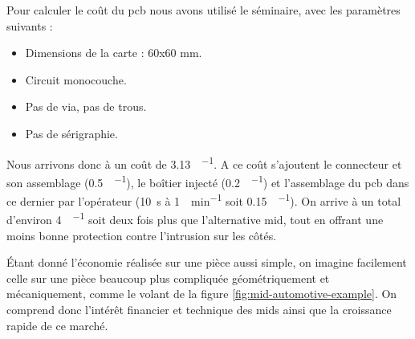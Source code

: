 Pour calculer le coût du \gls{pcb} nous avons utilisé le séminaire\cite{pcb-2013}, avec les paramètres suivants :
\begin{itemize}
    \item Dimensions de la carte : 60x60 \si{\milli\meter}.
    \item Circuit monocouche.
    \item Pas de via, pas de trous.
    \item Pas de sérigraphie.
\end{itemize}

Nous arrivons donc à un coût de \SI{3.13}{\chf\per\piece}.
A ce coût s'ajoutent le connecteur et son assemblage (\SI{0.5}{\chf\per\piece}), le boîtier injecté (\SI{0.2}{\chf\per\piece}) et l'assemblage du \gls{pcb} dans ce dernier par l'opérateur
(\SI{10}{\second} à \SI{1}{\chf\per\minute} soit \SI{0.15}{\chf\per\piece}).
On arrive à un total d'environ \SI{4}{\chf\per\piece} soit deux fois plus que l'alternative \gls{mid}, tout en offrant une moins bonne protection contre l'intrusion sur les côtés.

Étant donné l'économie réalisée sur une pièce aussi simple, on imagine facilement celle sur une pièce beaucoup plus compliquée géométriquement et mécaniquement, comme le volant de la figure \ref{fig:mid-automotive-example}.
On comprend donc l'intérêt financier et technique des \glspl{mid} ainsi que la croissance rapide de ce marché.
